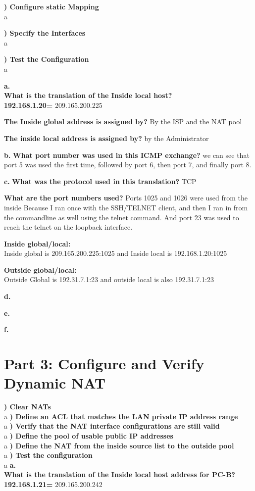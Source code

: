 \documentclass{report}
\newcommand{\mysection}[1]{\section*{#1}}
\newcommand{\mysubsection}[2]{\textbf{\romannumeral #1) #2}}
\begin{document}
\mysubsection{1}{Configure static Mapping}\\
a

\noindent\mysubsection{2}{Specify the Interfaces}\\
a

\noindent\mysubsection{3}{Test the Configuration}\\
a

{\bf{a.}}\\
{\bf{What is the translation of the Inside local host?}}\\
{\bf{192.168.1.20=}} 209.165.200.225


{\bf{The Inside global address is assigned by?}} By the ISP and the NAT pool


{\bf{The inside local address is assigned by?}} by the Administrator

{\bf{b.}}
{\bf{What port number was used in this ICMP exchange?}} we can see that port 5
was used the first time, followed by port 6, then port 7, and finally port 8.

{\bf{c.}}
{\bf{What was the protocol used in this translation?}} TCP


{\bf{What are the port numbers used?}} Ports 1025 and 1026 were used from the
inside Because I ran once with the SSH/TELNET client, and then I ran in from
the commandline as well using the telnet command. And port 23 was used to reach the telnet on the loopback interface.

{\bf{Inside global/local:}}\\
Inside global is 209.165.200.225:1025 and Inside local is 192.168.1.20:1025


{\bf{Outside global/local:}}\\
Outside Global is 192.31.7.1:23 and outside local is also 192.31.7.1:23

{\bf{d.}}

{\bf{e.}}

{\bf{f.}}



\mysection{\textbf{Part 3: Configure and Verify Dynamic NAT }}

\mysubsection{1}{Clear NATs}\\
a
\noindent\mysubsection{2}{Define an ACL that matches the LAN private IP address
range}\\
a
\noindent\mysubsection{3}{Verify that the NAT interface configurations are
still valid}\\
a
\noindent\mysubsection{4}{Define the pool of usable public IP addresses}\\
a
\noindent\mysubsection{5}{Define the NAT from the inside source list to the
outside pool}\\
a
\noindent\mysubsection{6}{Test the configuration}\\
a
{\bf{a.}}\\
{\bf{What is the translation of the Inside local host address for PC-B?}}
{\bf{192.168.1.21=}} 209.165.200.242
\end{document}

